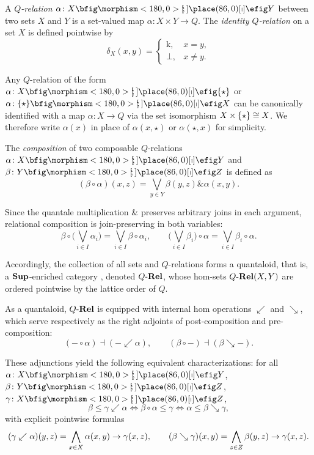\documentclass{tac}
\begin{document}
A \emph{\(Q\)-relation} \(\alpha\colon X\nto Y\) between two sets \(X\) and \(Y\) is a set-valued map \(\alpha\colon X\times Y\to Q\). The \emph{identity \(Q\)-relation} on a set \(X\) is defined pointwise by
\begin{equation*}
\delta_X(x,y)=
\begin{cases}
\mathrm{k}, & x=y,\\
\bot, & x\neq y.
\end{cases}
\end{equation*}

Any \(Q\)-relation of the form \(\alpha\colon X\nto\sigt\) or \(\alpha\colon\sigt\nto X\) can be canonically identified with a map \(\alpha\colon X\to Q\) via the set isomorphism \(X\times{\{\star\}}\cong X\). We therefore write \(\alpha(x)\) in place of \(\alpha(x,\star)\) or \(\alpha(\star,x)\) for simplicity.

The \emph{composition} of two composable \(Q\)-relations \(\alpha\colon X\nto Y\) and \(\beta\colon Y\nto Z\) is defined as
\begin{equation*}
(\beta\circ\alpha)(x,z)=\bigvee_{y\in Y}\beta(y,z)\&\alpha(x,y).
\end{equation*}

Since the quantale multiplication \(\&\) preserves arbitrary joins in each argument, relational composition is join-preserving in both variables:
\begin{equation*}
\beta\circ\Big(\bigvee_{i\in I}\alpha_i\Big)=\bigvee_{i\in I}\beta\circ\alpha_i,
\qquad
\Big(\bigvee_{i\in I}\beta_i\Big)\circ\alpha=\bigvee_{i\in I}\beta_i\circ\alpha.
\end{equation*}

Accordingly, the collection of all sets and \(Q\)-relations forms a quantaloid, that is, a $\mathbf{Sup}$-enriched category \cite{Rosenthal1996}, denoted \(Q\text{-}\mathbf{Rel}\), whose hom-sets \(Q\text{-}\mathbf{Rel}(X,Y)\) are ordered pointwise by the lattice order of \(Q\).

As a quantaloid, \(Q\text{-}\mathbf{Rel}\) is equipped with internal hom operations \(\swarrow\) and \(\searrow\), which serve respectively as the right adjoints of post-composition and pre-composition:
\begin{equation*}
(-\circ\alpha)\dashv(-\swarrow\alpha),\qquad (\beta\circ-)\dashv(\beta\searrow-).
\end{equation*}

These adjunctions yield the following equivalent characterizations: for all \(\alpha\colon X\nto Y\), \(\beta\colon Y\nto Z\), \(\gamma\colon X\nto Z\),
\begin{equation*}
\beta\leq\gamma\swarrow\alpha \iff \beta\circ\alpha\leq\gamma \iff \alpha\leq\beta\searrow\gamma,
\end{equation*}
with explicit pointwise formulas
\begin{equation*}
(\gamma\swarrow\alpha)(y,z)=\bigwedge_{x\in X}\alpha(x,y)\rightarrow\gamma(x,z),
\qquad
(\beta\searrow\gamma)(x,y)=\bigwedge_{z\in Z}\beta(y,z)\rightarrow\gamma(x,z).
\end{equation*}
\end{document}
